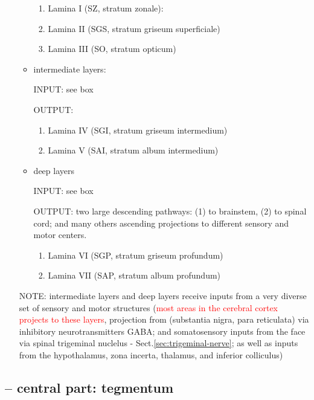 \begin{enumerate}
\begin{itemize}
\begin{enumerate}
  \item Lamina I (SZ, stratum zonale):
  
  \item Lamina II (SGS, stratum griseum superficiale)
  
  \item Lamina III (SO, stratum opticum)
\end{enumerate}
  
  \item intermediate layers: 

INPUT: see box

OUTPUT: 

\begin{enumerate}
  \item Lamina IV (SGI, stratum griseum intermedium)
  
  \item Lamina V (SAI, stratum album intermedium)
\end{enumerate}

  \item deep layers

INPUT: see box

OUTPUT: two large descending pathways: (1) to brainstem, (2) to spinal cord;
and many others ascending projections to different sensory and motor centers.

\begin{enumerate}
  \item Lamina VI (SGP, stratum griseum profundum)
  \item Lamina VII (SAP, stratum album profundum)
\end{enumerate}
\end{itemize}
NOTE: intermediate layers and deep layers receive inputs from a very diverse set
of sensory and motor structures (\textcolor{red}{most areas in the cerebral cortex
projects to these layers}, projection from (substantia nigra, para
reticulata) via inhibitory neurotransmitters GABA; and somatosensory inputs
from the face via spinal trigeminal nuclelus -
Sect.\ref{sec:trigeminal-nerve};  as well as inputs from the hypothalamus,
zona incerta, thalamus, and inferior colliculus)

\end{enumerate}

\subsection{-- central part: tegmentum}
\label{sec:tegmentum}

